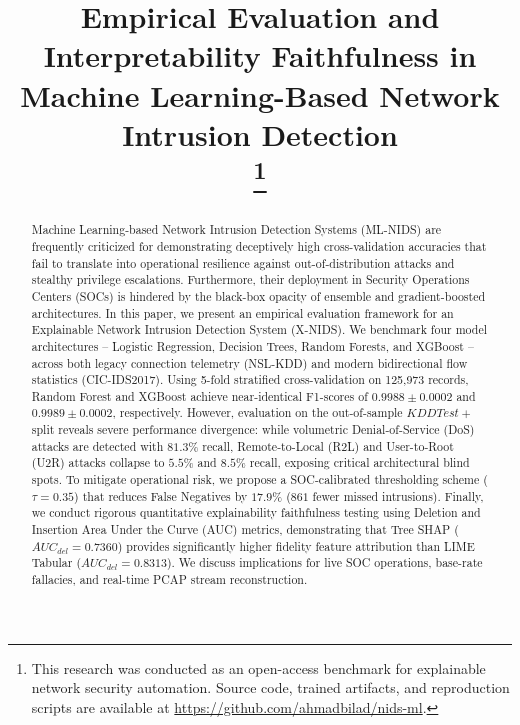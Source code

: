 \documentclass[conference]{IEEEtran}
\begin{document}
\title{Empirical Evaluation and Interpretability Faithfulness in Machine Learning-Based Network Intrusion Detection\\
\thanks{This research was conducted as an open-access benchmark for explainable network security automation. Source code, trained artifacts, and reproduction scripts are available at \url{https://github.com/ahmadbilad/nids-ml}.}}

\author{
}

\maketitle

\begin{abstract}
Machine Learning-based Network Intrusion Detection Systems (ML-NIDS) are frequently criticized for demonstrating deceptively high cross-validation accuracies that fail to translate into operational resilience against out-of-distribution attacks and stealthy privilege escalations. Furthermore, their deployment in Security Operations Centers (SOCs) is hindered by the black-box opacity of ensemble and gradient-boosted architectures. In this paper, we present an empirical evaluation framework for an Explainable Network Intrusion Detection System (X-NIDS). We benchmark four model architectures -- Logistic Regression, Decision Trees, Random Forests, and XGBoost -- across both legacy connection telemetry (NSL-KDD) and modern bidirectional flow statistics (CIC-IDS2017). Using 5-fold stratified cross-validation on 125,973 records, Random Forest and XGBoost achieve near-identical F1-scores of $0.9988 \pm 0.0002$ and $0.9989 \pm 0.0002$, respectively. However, evaluation on the out-of-sample $KDDTest+$ split reveals severe performance divergence: while volumetric Denial-of-Service (DoS) attacks are detected with $81.3\%$ recall, Remote-to-Local (R2L) and User-to-Root (U2R) attacks collapse to $5.5\%$ and $8.5\%$ recall, exposing critical architectural blind spots. To mitigate operational risk, we propose a SOC-calibrated thresholding scheme ($\tau = 0.35$) that reduces False Negatives by $17.9\%$ ($861$ fewer missed intrusions). Finally, we conduct rigorous quantitative explainability faithfulness testing using Deletion and Insertion Area Under the Curve (AUC) metrics, demonstrating that Tree SHAP ($AUC_{del} = 0.7360$) provides significantly higher fidelity feature attribution than LIME Tabular ($AUC_{del} = 0.8313$). We discuss implications for live SOC operations, base-rate fallacies, and real-time PCAP stream reconstruction.
\end{abstract}
\end{document}
